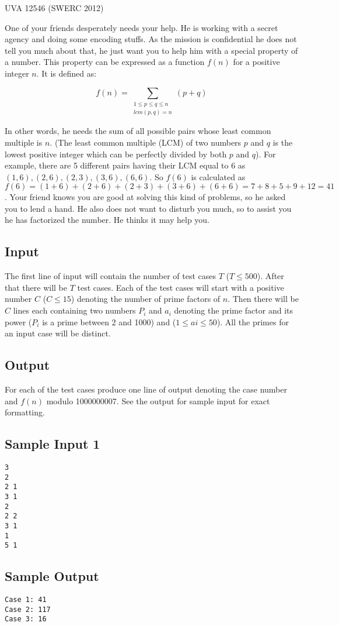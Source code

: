 

\noindent
UVA 12546 (SWERC 2012)\bigskip

One of your friends desperately needs your help. He is working with a secret agency and doing some encoding stuffs. As the mission is confidential he does not tell you much about that, he just want you to help him with a special property of a number. This property can be expressed as a function $f(n)$ for a positive integer $n$. It is defined as:

\[ f(n) = \sum_{\substack{1 \leqslant p \leqslant q \leqslant n\\lcm(p, q) = n}} (p + q) \]

In other words, he needs the sum of all possible pairs whose least common multiple is $n$. (The least common multiple (LCM) of two numbers $p$ and $q$ is the lowest positive integer which can be perfectly divided by both $p$ and $q$). For example, there are 5 different pairs having their LCM equal to 6 as $(1, 6), (2, 6), (2, 3), (3, 6), (6, 6)$. So $f(6)$ is calculated as $f(6) = (1+6)+(2+6)+(2+3)+(3+6)+(6+6) = 7 + 8 + 5 + 9 + 12 = 41$.
Your friend knows you are good at solving this kind of problems, so he asked you to lend a hand. He also does not want to disturb you much, so to assist you he has factorized the number. He thinks it may help you.

\subsection*{Input}

The first line of input will contain the number of test cases $T$ ($T \leqslant 500$). After that there will be $T$ test cases. Each of the test cases will start with a positive number $C$ ($C \leqslant 15$) denoting the number of prime factors of $n$. Then there will be $C$ lines each containing two numbers $P_i$ and $a_i$ denoting the prime factor and its power ($P_i$ is a prime between 2 and 1000) and ($1 \leqslant ai \leqslant 50$). All the primes for an input case will be distinct.

\subsection*{Output}

For each of the test cases produce one line of output denoting the case number and $f(n)$ modulo 1000000007. See the output for sample input for exact formatting.

\subsection*{Sample Input 1}

\begin{verbatim}
3
2
2 1
3 1
2
2 2
3 1
1
5 1
\end{verbatim}

\subsection*{Sample Output}

\begin{verbatim}
Case 1: 41
Case 2: 117
Case 3: 16
\end{verbatim}
